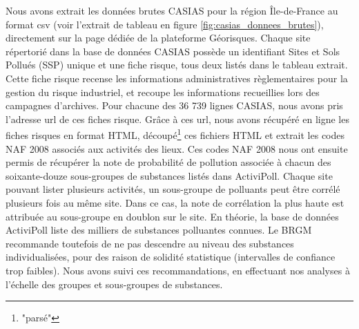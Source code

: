 \documentclass[a4paper,twoside,12pt]{book}
\begin{document}
Nous avons extrait les données brutes CASIAS pour la région Île-de-France au format csv (voir l'extrait de tableau en figure \ref{fig:casias_donnees_brutes}), directement sur la page dédiée de la plateforme Géorisques. Chaque site répertorié dans la base de données CASIAS possède un identifiant Sites et Sols Pollués (SSP) unique et une fiche risque, tous deux listés dans le tableau extrait. Cette fiche risque recense les informations administratives règlementaires pour la gestion du risque industriel, et recoupe les informations recueillies lors des campagnes d’archives. Pour chacune des 36 739 lignes CASIAS, nous avons pris l’adresse url de ces fiches risque. Grâce à ces url, nous avons récupéré en ligne les fiches risques en format HTML, découpé\footnote{"parsé"} ces fichiers HTML et extrait les codes NAF 2008 associés aux activités des lieux. Ces codes NAF 2008 nous ont ensuite permis de récupérer la note de probabilité de pollution associée à chacun des soixante-douze sous-groupes de substances listés dans ActiviPoll. Chaque site pouvant lister plusieurs activités, un sous-groupe de polluants peut être corrélé plusieurs fois au même site. Dans ce cas, la note de corrélation la plus haute est attribuée au sous-groupe en doublon sur le site. En théorie, la base de données ActiviPoll liste des milliers de substances polluantes connues. Le BRGM recommande toutefois de ne pas descendre au niveau des substances individualisées, pour des raison de solidité statistique (intervalles de confiance trop faibles). Nous avons suivi ces recommandations, en effectuant nos analyses à l'échelle des groupes et sous-groupes de substances. 
\end{document}
